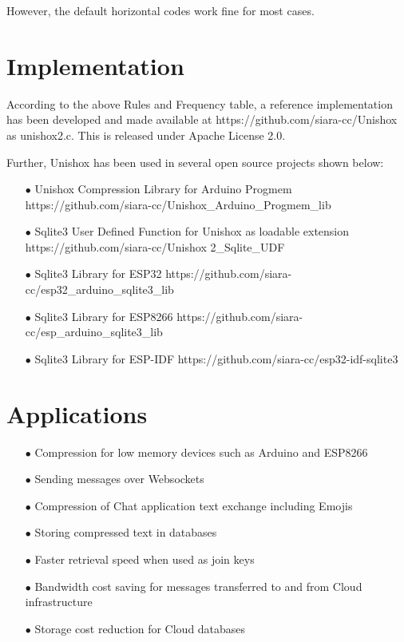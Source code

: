 \documentclass[]{article}
\begin{document}
However, the default horizontal codes work fine for most cases.

\section{Implementation}

According to the above Rules and Frequency table, a reference implementation has been developed and made available at https://github.com/siara-cc/Unishox as unishox2.c.  This is released under Apache License 2.0.

Further, Unishox has been used in several open source projects shown below:

\begin{itemize}
	\item[$\bullet$] Unishox Compression Library for Arduino Progmem \newline https://github.com/siara-cc/Unishox\_Arduino\_Progmem\_lib
	\item[$\bullet$] Sqlite3 User Defined Function for Unishox as loadable extension \newline https://github.com/siara-cc/Unishox 2\_Sqlite\_UDF
	\item[$\bullet$] Sqlite3 Library for ESP32 \newline https://github.com/siara-cc/esp32\_arduino\_sqlite3\_lib
	\item[$\bullet$] Sqlite3 Library for ESP8266 \newline https://github.com/siara-cc/esp\_arduino\_sqlite3\_lib
	\item[$\bullet$] Sqlite3 Library for ESP-IDF \newline https://github.com/siara-cc/esp32-idf-sqlite3
\end{itemize}

\section{Applications}

\begin{itemize}
	\item[$\bullet$] Compression for low memory devices such as Arduino and ESP8266
	\item[$\bullet$] Sending messages over Websockets
	\item[$\bullet$] Compression of Chat application text exchange including Emojis
	\item[$\bullet$] Storing compressed text in databases
	\item[$\bullet$] Faster retrieval speed when used as join keys
	\item[$\bullet$] Bandwidth cost saving for messages transferred to and from Cloud infrastructure
	\item[$\bullet$] Storage cost reduction for Cloud databases
\end{itemize}
\end{document}
